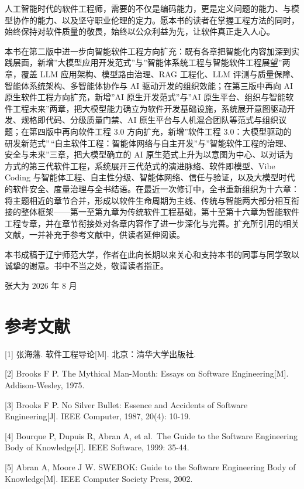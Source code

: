 \documentclass[
]{ctexbook}
\begin{document}
人工智能时代的软件工程师，需要的不仅是编码能力，更是定义问题的能力、与模型协作的能力、以及坚守职业伦理的定力。愿本书的读者在掌握工程方法的同时，始终保持对软件质量的敬畏，始终以公众利益为先，让软件真正走入人心。

本书在第二版中进一步向智能软件工程方向扩充：既有各章把智能化内容加深到实践层面，新增''大模型应用开发范式''与''智能体系统工程与智能软件工程展望''两章，覆盖
LLM 应用架构、模型路由治理、RAG 工程化、LLM
评测与质量保障、智能体系统架构、多智能体协作与 AI
驱动开发的组织效能；在第三版中再向 AI 原生软件工程方向扩充，新增''AI
原生开发范式''与''AI
原生平台、组织与智能软件工程未来''两章，把大模型能力确立为软件开发基础设施，系统展开意图驱动开发、规格即代码、分级质量门禁、AI
原生平台与人机混合团队等范式与组织议题；在第四版中再向软件工程 3.0
方向扩充，新增''软件工程
3.0：大模型驱动的研发新范式''\,``自主软件工程：智能体网络与自主开发''与''智能软件工程的治理、安全与未来''三章，把大模型确立的
AI
原生范式上升为以意图为中心、以对话为方式的第三代软件工程，系统展开三代范式的演进脉络、软件即模型、Vibe
Coding
与智能体工程、自主性分级、智能体网络、信任与验证，以及大模型时代的软件安全、度量治理与全书结语。在最近一次修订中，全书重新组织为十六章：将主题相近的章节合并，形成以软件生命周期为主线、传统与智能两大部分相互衔接的整体框架------第一至第九章为传统软件工程基础，第十至第十六章为智能软件工程专章，并在章节衔接处对各章内容作了进一步深化与完善。扩充所引用的相关文献，一并补充于参考文献中，供读者延伸阅读。

本书成稿于辽宁师范大学，作者在此向长期以来关心和支持本书的同事与同学致以诚挚的谢意。书中不当之处，敬请读者指正。

张大为 2026 年 8 月

\section{参考文献}\label{ux53c2ux8003ux6587ux732e}

{[}1{]} 张海藩. 软件工程导论{[}M{]}. 北京：清华大学出版社.

{[}2{]} Brooks F P. The Mythical Man-Month: Essays on Software
Engineering{[}M{]}. Addison-Wesley, 1975.

{[}3{]} Brooks F P. No Silver Bullet: Essence and Accidents of Software
Engineering{[}J{]}. IEEE Computer, 1987, 20(4): 10-19.

{[}4{]} Bourque P, Dupuis R, Abran A, et al.~The Guide to the Software
Engineering Body of Knowledge{[}J{]}. IEEE Software, 1999: 35-44.

{[}5{]} Abran A, Moore J W. SWEBOK: Guide to the Software Engineering
Body of Knowledge{[}M{]}. IEEE Computer Society Press, 2002.
\end{document}
